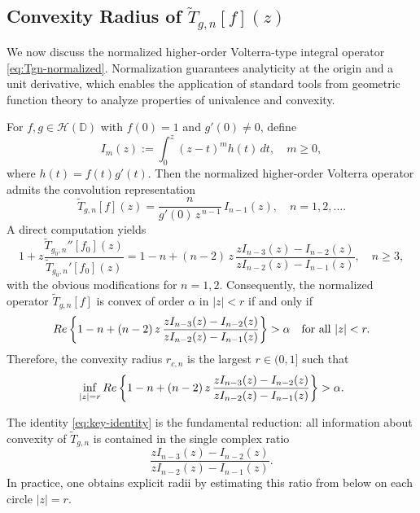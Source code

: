 \documentclass[12pt,a4paper]{amsart}
\numberwithin{equation}{section}
\theoremstyle{remark}
\newcommand{\D}{\mathbb{D}}
\begin{document}
\subsection{Convexity Radius of \texorpdfstring{$\widetilde{T}_{g,n}[f](z)$}{Tg,n[f](z)}}
We now discuss the normalized higher-order Volterra-type integral operator \eqref{eq:Tgn-normalized}. Normalization guarantees analyticity at the origin and a unit derivative, which enables the application of standard tools from geometric function theory to analyze properties of univalence and convexity.

For \(f,g\in\mathcal{H}(\D)\) with \(f(0)=1\) and \(g'(0)\neq0\), define
\begin{equation}\label{Im-z}
 I_m(z):=\int_0^z (z-t)^m h(t)\,dt,\quad m\ge0,
\end{equation}
where $h(t)=f(t)g'(t)$. Then the normalized higher-order Volterra operator admits the convolution representation
\begin{equation*}
\widetilde{T}_{g,n}[f](z)
=\frac{n}{g'(0)\,z^{\,n-1}}\,I_{n-1}(z),
\quad n=1,2,\ldots.
\end{equation*}
A direct computation yields
\begin{equation}\label{eq:key-identity}
1+z\frac{\widetilde{T}_{g_0,n}''[f_0](z)}{\widetilde{T}_{g_0,n}'[f_0](z)}
=1-n+(n-2)\,z\,\frac{zI_{n-3}(z)-I_{n-2}(z)}{zI_{n-2}(z)-I_{n-1}(z)},\quad n\ge3,
\end{equation}
with the obvious modifications for \(n=1,2\). 
Consequently, the normalized operator \(\widetilde{T}_{g,n}[f]\) is convex of order \(\alpha\) in \(|z|<r\)
if and only if
\[
{\rm Re}\left\{1-n+(n-2)\,z\,\frac{zI_{n-3}(z)-I_{n-2}(z)}{zI_{n-2}(z)-I_{n-1}(z)}\right\}>\alpha
\quad\text{for all }|z|<r.
\]
Therefore, the convexity radius \(r_{c,n}\) is the largest \(r\in(0,1]\) such that
\begin{equation*}\label{eq:general-radius}
\inf_{|z|=r}{\rm Re}\left\{1-n+(n-2)\,z\,\frac{zI_{n-3}(z)-I_{n-2}(z)}{zI_{n-2}(z)-I_{n-1}(z)}\right\}>\alpha.
\end{equation*}

The identity \eqref{eq:key-identity} is the fundamental reduction: all information about convexity of \(\widetilde T_{g,n}\) is contained in the single complex ratio
\begin{equation*}
\frac{zI_{n-3}(z)-I_{n-2}(z)}{zI_{n-2}(z)-I_{n-1}(z)}.
\end{equation*}
In practice, one obtains explicit radii by estimating this ratio from below on each circle \(|z|=r\). 
\end{document}
